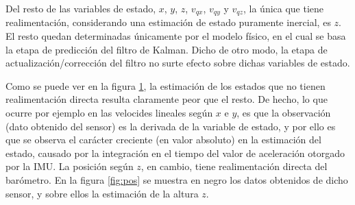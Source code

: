 \documentclass[main]{subfiles}
\begin{document}
Del resto de las variables de estado, $x$, $y$, $z$, $v_{qx}$, $v_{qy}$ y $v_{qz}$, la única que tiene realimentación, considerando una estimación de estado puramente inercial, es $z$. El resto quedan determinadas únicamente por el modelo físico, en el cual se basa la etapa de predicción del filtro de Kalman. Dicho de otro modo, la etapa de actualización/corrección del filtro no surte efecto sobre dichas variables de estado.\\

\begin{figure} [h!]
\centering
   \hspace{10pt}
  \caption{}
  \label{fig:posyvel}
\end{figure}

Como se puede ver en la figura \ref{fig:posyvel}, la estimación de los estados que no tienen realimentación directa resulta claramente peor que el resto. De hecho, lo que ocurre por ejemplo en las velocides lineales según $x$ e $y$, es que la observación (dato obtenido del sensor) es la derivada de la variable de estado, y por ello es que se observa el carácter creciente (en valor absoluto) en la estimación del estado, causado por la integración en el tiempo del valor de aceleración otorgado por la IMU. La posición según $z$, en cambio, tiene realimentación directa del barómetro. En la figura \ref{fig:pos} se muestra en negro los datos obtenidos de dicho sensor, y sobre ellos la estimación de la altura $z$.
\end{document}
